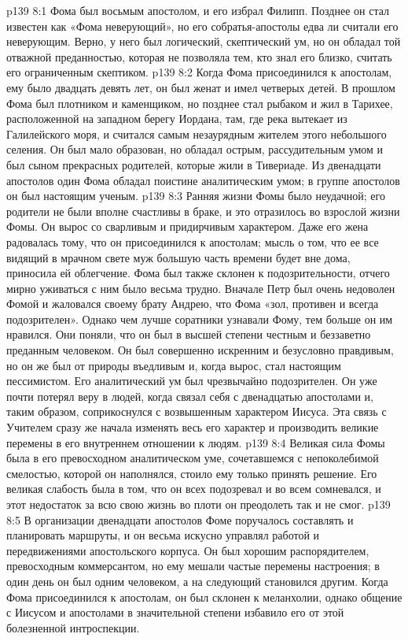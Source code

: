\vs p139 8:1 Фома был восьмым апостолом, и его избрал Филипп. Позднее он стал известен как «Фома неверующий», но его собратья\hyp{}апостолы едва ли считали его неверующим. Верно, у него был логический, скептический ум, но он обладал той отважной преданностью, которая не позволяла тем, кто знал его близко, считать его ограниченным скептиком.
\vs p139 8:2 Когда Фома присоединился к апостолам, ему было двадцать девять лет, он был женат и имел четверых детей. В прошлом Фома был плотником и каменщиком, но позднее стал рыбаком и жил в Тарихее, расположенной на западном берегу Иордана, там, где река вытекает из Галилейского моря, и считался самым незаурядным жителем этого небольшого селения. Он был мало образован, но обладал острым, рассудительным умом и был сыном прекрасных родителей, которые жили в Тивериаде. Из двенадцати апостолов один Фома обладал поистине аналитическим умом; в группе апостолов он был настоящим ученым.
\vs p139 8:3 Ранняя жизни Фомы было неудачной; его родители не были вполне счастливы в браке, и это отразилось во взрослой жизни Фомы. Он вырос со сварливым и придирчивым характером. Даже его жена радовалась тому, что он присоединился к апостолам; мысль о том, что ее все видящий в мрачном свете муж большую часть времени будет вне дома, приносила ей облегчение. Фома был также склонен к подозрительности, отчего мирно уживаться с ним было весьма трудно. Вначале Петр был очень недоволен Фомой и жаловался своему брату Андрею, что Фома «зол, противен и всегда подозрителен». Однако чем лучше соратники узнавали Фому, тем больше он им нравился. Они поняли, что он был в высшей степени честным и беззаветно преданным человеком. Он был совершенно искренним и безусловно правдивым, но он же был от природы въедливым и, когда вырос, стал настоящим пессимистом. Его аналитический ум был чрезвычайно подозрителен. Он уже почти потерял веру в людей, когда связал себя с двенадцатью апостолами и, таким образом, соприкоснулся с возвышенным характером Иисуса. Эта связь с Учителем сразу же начала изменять весь его характер и производить великие перемены в его внутреннем отношении к людям.
\vs p139 8:4 Великая сила Фомы была в его превосходном аналитическом уме, сочетавшемся с непоколебимой смелостью, которой он наполнялся, стоило ему только принять решение. Его великая слабость была в том, что он всех подозревал и во всем сомневался, и этот недостаток за всю свою жизнь во плоти он преодолеть так и не смог.
\vs p139 8:5 В организации двенадцати апостолов Фоме поручалось составлять и планировать маршруты, и он весьма искусно управлял работой и передвижениями апостольского корпуса. Он был хорошим распорядителем, превосходным коммерсантом, но ему мешали частые перемены настроения; в один день он был одним человеком, а на следующий становился другим. Когда Фома присоединился к апостолам, он был склонен к меланхолии, однако общение с Иисусом и апостолами в значительной степени избавило его от этой болезненной интроспекции.
